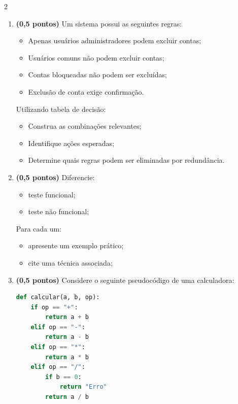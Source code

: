 \documentclass[a4paper,12pt]{article}
\begin{document}
\begin{multicols}{2}
\begin{enumerate}[leftmargin=*]
\vspace{0.2cm}

\item \textbf{(0,5 pontos)} Um sistema possui as seguintes regras:

\begin{itemize}[itemsep=0pt, topsep=0pt]
    \item Apenas usuários administradores podem excluir contas;
    \item Usuários comuns não podem excluir contas;
    \item Contas bloqueadas não podem ser excluídas;
    \item Exclusão de conta exige confirmação.
\end{itemize}

Utilizando tabela de decisão:

\begin{itemize}[itemsep=0pt, topsep=0pt]
    \item Construa as combinações relevantes;
    \item Identifique ações esperadas;
    \item Determine quais regras podem ser eliminadas por redundância.
\end{itemize}

\vspace{0.2cm}

\item \textbf{(0,5 pontos)} Diferencie:

\begin{itemize}[itemsep=0pt, topsep=0pt]
    \item teste funcional;
    \item teste não funcional;
\end{itemize}

Para cada um:

\begin{itemize}[itemsep=0pt, topsep=0pt]
    \item apresente um exemplo prático;
    \item cite uma técnica associada;
\end{itemize}

\vspace{0.2cm}
\columnbreak
\item \textbf{(0,5 pontos)} Considere o seguinte pseudocódigo de uma calculadora:

\begin{lstlisting}[language=Python,
frame=single,
breaklines=true,
columns=fullflexible
]
def calcular(a, b, op):
    if op == "+":
        return a + b
    elif op == "-":
        return a - b
    elif op == "*":
        return a * b
    elif op == "/":
        if b == 0:
            return "Erro"
        return a / b
\end{lstlisting}


\end{enumerate}
\end{multicols}
\end{document}
